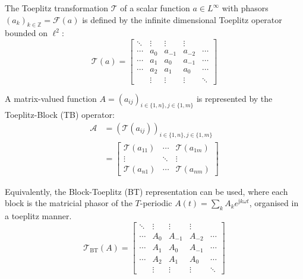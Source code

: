 \documentclass[11pt,a4paper]{article}
\begin{document}
The Toeplitz transformation $\mathcal{T}$ of a scalar function $a \in L^\infty$ with phasors $(a_k)_{k \in \mathbb{Z}} = \mathcal{F}(a)$ is defined by the infinite dimensional Toeplitz operator bounded on $\ell^2$:
\begin{equation}\label{eq:toeplitz_matrix_def}
\mathcal{T}(a) = \begin{bmatrix}
\ddots & \vdots & \vdots & \vdots & \\
\cdots & a_0 & a_{-1} & a_{-2} & \cdots \\
\cdots & a_1 & a_0 & a_{-1} & \cdots \\
\cdots & a_2 & a_1 & a_0 & \cdots \\
& \vdots & \vdots & \vdots & \ddots
\end{bmatrix}
\end{equation}

A matrix-valued function $A = (a_{ij})_{i \in \{1,n\}, j \in \{1,m\}}$ is represented by the Toeplitz-Block (TB) operator:
\begin{align}
\mathcal{A} &= (\mathcal{T}(a_{ij}))_{i \in \{1,n\}, j \in \{1,m\}}\\ 
&= \begin{bmatrix} 
    \mathcal{T}(a_{11}) & \cdots & \mathcal{T}(a_{1m}) \\
    \vdots & \ddots & \vdots \\
    \mathcal{T}(a_{n1}) & \cdots & \mathcal{T}(a_{nm})
\end{bmatrix}
\end{align}

Equivalently, the Block-Toeplitz (BT) representation can be used, where each block is the matricial phasor of the $T$-periodic $A(t) = \sum_k A_k e^{\mathrm{j}k\omega t}$, organised in a toeplitz manner.
\begin{equation}
\mathcal{T}_{\mathrm{BT}}(A) = \begin{bmatrix}
\ddots & \vdots & \vdots & \vdots & \\
\cdots & A_0 & A_{-1} & A_{-2} & \cdots \\
\cdots & A_1 & A_0 & A_{-1} & \cdots \\
\cdots & A_2 & A_1 & A_0 & \cdots \\
& \vdots & \vdots & \vdots & \ddots
\end{bmatrix}
\end{equation}
\end{document}
